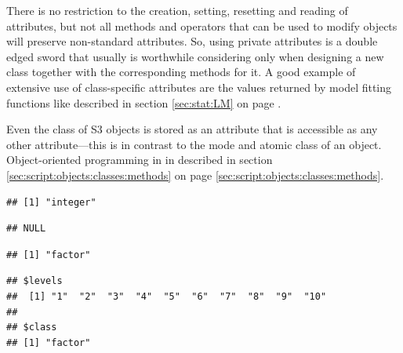 \documentclass[krantz2]{krantz}\usepackage{knitr}%
\begin{document}
\begin{warningbox}
There is no restriction to the creation, setting, resetting and reading of attributes, but not all methods and operators that can be used to modify objects will preserve non-standard attributes. So, using private attributes is a double edged sword that usually is worthwhile considering only when designing a new class together with the corresponding methods for it. A good example of extensive use of class-specific attributes are the values returned by model fitting functions like  described in section \ref{sec:stat:LM} on page \pageref{sec:stat:LM}.

Even the class of S3 objects is stored as an attribute that is accessible as any other attribute---this is in contrast to the mode and atomic class of an object. Object-oriented programming in \Rlang in described in section \ref{sec:script:objects:classes:methods} on page \ref{sec:script:objects:classes:methods}.

\begin{knitrout}\footnotesize
{}\color{fgcolor}\begin{kframe}
\begin{alltt}
 \hlkwb{<-} \hlopt{:}
\end{alltt}
\begin{verbatim}
## [1] "integer"
\end{verbatim}
\begin{alltt}
\end{alltt}
\begin{verbatim}
## NULL
\end{verbatim}
\begin{alltt}
 \hlkwb{<-} 
\end{alltt}
\begin{verbatim}
## [1] "factor"
\end{verbatim}
\begin{alltt}
\end{alltt}
\begin{verbatim}
## $levels
##  [1] "1"  "2"  "3"  "4"  "5"  "6"  "7"  "8"  "9"  "10"
## 
## $class
## [1] "factor"
\end{verbatim}
\end{kframe}
\end{knitrout}
\end{warningbox}
\end{document}
